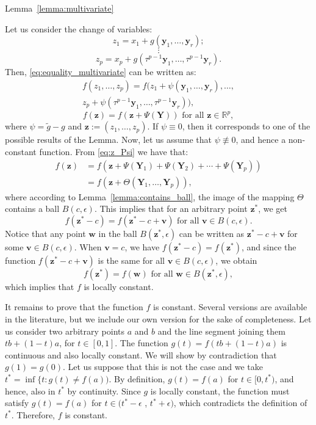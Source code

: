 \documentclass[letterpaper,10pt,journal]{IEEEtran}
\newcommand{\y}{\mathbf{y}}
\newcommand{\z}{\mathbf{z}}
\newcommand{\w}{\mathbf{w}}
\newcommand{\vv}{\mathbf{v}}
\newcommand{\Y}{\mathbf{Y}}
\newcommand{\R}{\mathbb R}
\begin{document}
\begin{myproof}{Lemma~\ref{lemma:multivariate}}

Let us consider the change of variables:
    $$
    z_1=x_1+g(\y_1,\ldots,\y_r);
    $$
    $$
    \vdots
    $$
    $$
    z_p=x_p+g(\tau^{p-1}\y_1,\ldots,\tau^{p-1}\y_r).
    $$
    Then, \eqref{eq:equality_multivariate} can be written as:
    \begin{multline}\label{eq:app1_1}
    f(z_1,\ldots,z_p)=
        f(z_1+\psi(\y_1,\ldots,\y_r),\ldots,\\
        z_p+\psi(\tau^{p-1}\y_1,\ldots,\tau^{p-1}\y_r)),    
    \end{multline}
    \begin{equation}\label{eq:z_Psi}
        f(\z)=f(\z+\Psi(\Y)) \text{ for all } \z\in\R^p,
    \end{equation}
    where $\psi=\tilde g-g$ and $\z:=(z_1,\ldots,z_p)$. If $\psi\equiv0$, then it corresponds to one of the possible results of the Lemma. Now, let us assume that $\psi\not\equiv0$, and hence a non-constant function. From \eqref{eq:z_Psi} we have that:
    \begin{align}
        f(\z)&=f(\z+\Psi(\Y_1)+\Psi(\Y_2)+\cdots+\Psi(\Y_p))\nonumber\\&=f(\z+\Theta(\Y_1,\ldots,\Y_p)),
    \end{align}
    where according to Lemma~\ref{lemma:contains_ball}, the image of the mapping $\Theta$ contains a ball $B(c,\epsilon)$. This implies that for an arbitrary point $\z^*$, we get
    \begin{equation*}
    f(\z^*-c)=f(\z^*-c+\vv) \text{ for all } \vv\in B(c,\epsilon).  
    \end{equation*}
    Notice that any point $\w$ in the ball $B(\z^*,\epsilon)$ can  be written as $\z^*-c+\vv$ for some $\vv\in B(c,\epsilon)$. When $\vv=c$, we have $f(\z^*-c)=f(\z^*)$, and since the function $f(\z^*-c+\vv)$ is the same for all $\vv\in B(c,\epsilon)$, we obtain
    $$
    f(\z^*)=f(\w) \text{ for all } \w\in B(\z^*,\epsilon),
    $$
    which implies that $f$ is locally constant. 

   \noindent It remains to prove that the function $f$ is constant. Several versions are available in the literature, but we include our own version for the sake of completeness. Let us consider two arbitrary points $a$ and $b$ and the line segment joining them  $tb + (1-t)a$, for $t\in [0,1]$. The function $g(t)=f(tb + (1-t)a)$ is continuous and also locally constant. We will show by contradiction that $g(1)=g(0)$. Let us suppose that this is not the case and we take $t^* = \inf \{t: g(t)\neq f(a))$. By definition, $g(t) = f(a)$ for $t\in[0,t^*)$, and hence, also in 
   $t^*$ by continuity. Since $g$ is locally constant, the function must satisfy $g(t)=f(a)$ for $t\in (t^*-\epsilon$ , $t^* + \epsilon)$, which contradicts the definition of $t^*$. Therefore, $f$ is constant.
 \end{myproof}
\end{document}
